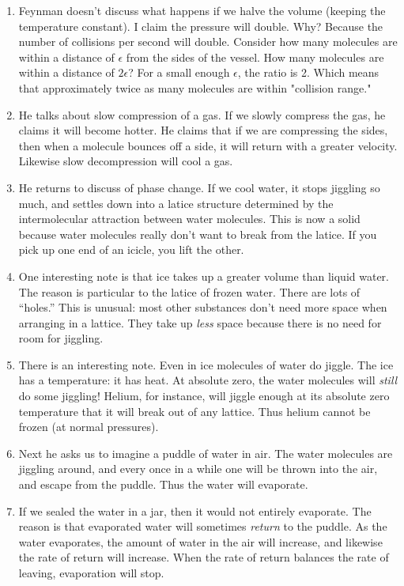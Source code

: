 \begin{enumerate}
  \item Feynman doesn't discuss what happens if we halve the volume
  (keeping the temperature constant). I claim the pressure will double.
  Why? Because the number of collisions per second will double. Consider
  how many molecules are within a distance of $\epsilon$ from the sides
  of the vessel. How many molecules are within a distance of
  $2\epsilon$? For a small enough $\epsilon$, the ratio is 2. Which
  means that approximately twice as many molecules are within "collision
  range."

  \item He talks about slow compression of a gas. If we slowly compress
  the gas, he claims it will become hotter. He claims that if we are
  compressing the sides, then when a molecule bounces off a side, it
  will return with a greater velocity. Likewise slow decompression will
  cool a gas.

  \item He returns to discuss of phase change. If we cool water, it
  stops jiggling so much, and settles down into a latice structure
  determined by the intermolecular attraction between water molecules.
  This is now a solid because water molecules really don't want to break
  from the latice. If you pick up one end of an icicle, you lift the
  other.

  \item One interesting note is that ice takes up a greater volume than
  liquid water. The reason is particular to the latice of frozen water.
  There are lots of ``holes.'' This is unusual: most other substances
  don't need more space when arranging in a lattice. They take up
  \emph{less} space because there is no need for room for jiggling.

  \item There is an interesting note. Even in ice molecules of water do
  jiggle. The ice has a temperature: it has heat. At absolute zero, the
  water molecules will \emph{still} do some jiggling! Helium, for
  instance, will jiggle enough at its absolute zero temperature that it
  will break out of any lattice. Thus helium cannot be frozen (at normal
  pressures).

  \item Next he asks us to imagine a puddle of water in air. The water
  molecules are jiggling around, and every once in a while one will be
  thrown into the air, and escape from the puddle. Thus the water will
  evaporate.

  \item If we sealed the water in a jar, then it would not entirely
  evaporate. The reason is that evaporated water will sometimes
  \emph{return} to the puddle. As the water evaporates, the amount of
  water in the air will increase, and likewise the rate of return will
  increase. When the rate of return balances the rate of leaving,
  evaporation will stop.


\end{enumerate}
